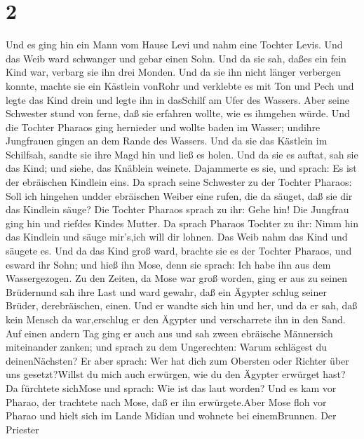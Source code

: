\hypertarget{section-1}{%
\section{2}\label{section-1}}

 Und es ging hin ein Mann vom Hause Levi und nahm eine
Tochter Levis.  Und das Weib ward schwanger und gebar einen
Sohn. Und da sie sah, daßes ein fein Kind war, verbarg sie ihn drei
Monden.  Und da sie ihn nicht länger verbergen konnte,
machte sie ein Kästlein vonRohr und verklebte es mit Ton und Pech und
legte das Kind drein und legte ihn in dasSchilf am Ufer des Wassers.
 Aber seine Schwester stund von ferne, daß sie erfahren
wollte, wie es ihmgehen würde.  Und die Tochter Pharaos ging
hernieder und wollte baden im Wasser; undihre Jungfrauen gingen an dem
Rande des Wassers. Und da sie das Kästlein im Schilfsah, sandte sie ihre
Magd hin und ließ es holen.  Und da sie es auftat, sah sie
das Kind; und siehe, das Knäblein weinete. Dajammerte es sie, und
sprach: Es ist der ebräischen Kindlein eins.  Da sprach
seine Schwester zu der Tochter Pharaos: Soll ich hingehen undder
ebräischen Weiber eine rufen, die da säuget, daß sie dir das Kindlein
säuge?  Die Tochter Pharaos sprach zu ihr: Gehe hin! Die
Jungfrau ging hin und riefdes Kindes Mutter.  Da sprach
Pharaos Tochter zu ihr: Nimm hin das Kindlein und säuge mir's,ich will
dir lohnen. Das Weib nahm das Kind und säugete es.  Und da
das Kind groß ward, brachte sie es der Tochter Pharaos, und esward ihr
Sohn; und hieß ihn Mose, denn sie sprach: Ich habe ihn aus dem
Wassergezogen.  Zu den Zeiten, da Mose war groß worden,
ging er aus zu seinen Brüdernund sah ihre Last und ward gewahr, daß ein
Ägypter schlug seiner Brüder, derebräischen, einen.  Und er
wandte sich hin und her, und da er sah, daß kein Mensch da war,erschlug
er den Ägypter und verscharrete ihn in den Sand.  Auf einen
andern Tag ging er auch aus und sah zween ebräische Männersich
miteinander zanken; und sprach zu dem Ungerechten: Warum schlägest du
deinenNächsten?  Er aber sprach: Wer hat dich zum Obersten
oder Richter über uns gesetzt?Willst du mich auch erwürgen, wie du den
Ägypter erwürget hast? Da fürchtete sichMose und sprach: Wie ist das
laut worden?  Und es kam vor Pharao, der trachtete nach
Mose, daß er ihn erwürgete.Aber Mose floh vor Pharao und hielt sich im
Lande Midian und wohnete bei einemBrunnen.  Der Priester
